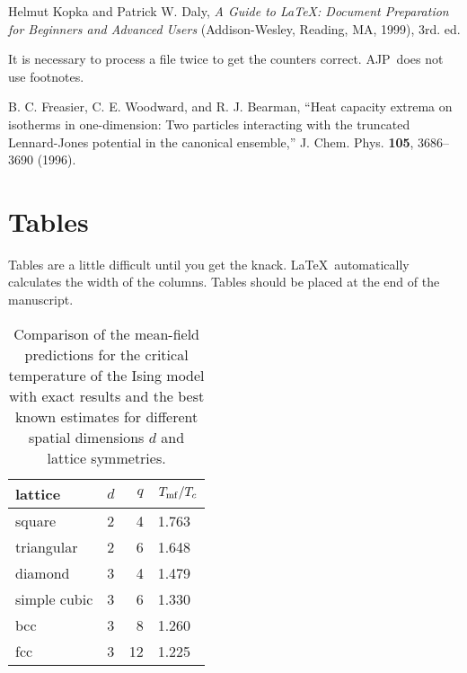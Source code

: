 \documentclass[a4paper,10pt,extramargin]{tubsartcl}
\newcommand{\ajp}{AJP}  %
\begin{document}

\begin{thebibliography}{5}

Helmut Kopka and Patrick W. Daly, \textsl{A Guide to
\LaTeX: Document Preparation for Beginners and Advanced Users} (Addison-Wesley, Reading, MA, 1999), 3rd. ed. 

It is necessary to process a file twice to
get the counters correct. \ajp\ does not use footnotes.

B. C. Freasier, C. E. Woodward, and R. J. Bearman,
``Heat capacity extrema on isotherms in one-dimension: Two
particles interacting with the truncated Lennard-Jones potential
in the canonical ensemble,'' J. Chem. Phys. {\bf 105}, 3686--3690
(1996).


\end{thebibliography}

\newpage
\section*{Tables}

Tables are a little difficult until you get the
knack.
\LaTeX\ automatically calculates the width of the columns. Tables
should be placed at the end of the manuscript.

\begin{table}[h]
\begin{center}
\begin{tabular}{|l|l|r|l|}
\hline
lattice & $d$ & $q$ & $T_{\rm mf}/T_c$ \\
\hline
square & 2 & 4 & 1.763 \\
\hline
triangular & 2 & 6 & 1.648 \\
\hline
diamond & 3 & 4 & 1.479 \\
\hline
simple cubic & 3 & 6 & 1.330 \\
\hline
bcc & 3 & 8 & 1.260 \\
\hline
fcc & 3 & 12 & 1.225 \\
\hline
\end{tabular}
\caption{\label{tab:tc}Comparison of the mean-field predictions
for the critical temperature of the Ising model with exact results
and the best known estimates for different spatial dimensions $d$
and lattice symmetries.}
\end{center}
\end{table}
\end{document}
